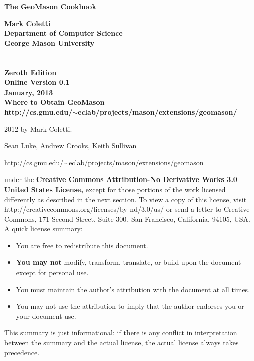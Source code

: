 \documentclass[twoside,10pt]{book}
\newcommand\reference[1]{\vspace{0.5em}\hfill{\parbox{6in}{\raggedleft\noindent\textsf{#1}}}}
\begin{document}
\begin{flushleft}
\huge\bf The GeoMason Cookbook\\[\baselineskip]
\end{flushleft}

\noindent\Large\bf Mark Coletti\\
{\large\rm 
Department of Computer Science\\
George Mason University}
\\
\\
\\
\Large\bf Zeroth Edition\\
\large\rm Online Version 0.1\\
\large\rm January, 2013\\

\vspace{5in}
\noindent\Large\bf Where to Obtain GeoMason\\
\large\rm http:/\!/cs.gmu.edu/\!\(\sim\)eclab/projects/mason/extensions/geomason/

\clearpage

\small 
{}  2012 by Mark Coletti.

\vspace{0.25in}
 Sean Luke, Andrew Crooks, Keith Sullivan

\vspace{0.25in}


\reference{http:/\!/cs.gmu.edu/\!\(\sim\)eclab/projects/mason/extensions/geomason}

\vspace{0.15in}

\vspace{0.15in}
	 under the {\bf Creative Commons Attribution-No Derivative Works 3.0 United States License,} except for those portions of the work licensed differently as described in the next section. To view a copy of this license, visit http:/\!/creativecommons.org/licenses/by-nd/3.0/us/ or send a letter to Creative Commons, 171 Second Street, Suite 300, San Francisco, California, 94105, USA.  A quick license summary:
	\begin{itemize}
	\item You are free to redistribute this document.
	\vspace{-0.5em}\item {\bf You may not} modify, transform, translate, or build upon the document except for personal use.   
	\vspace{-0.5em}\item You must maintain the author's attribution with the document at all times.
	\vspace{-0.5em}\item You may not use the attribution to imply that the author endorses you or your document use.  
	\end{itemize}
	This summary is just informational: if there is any conflict in interpretation between the summary and the actual license, the actual license always takes precedence.
\end{document}
